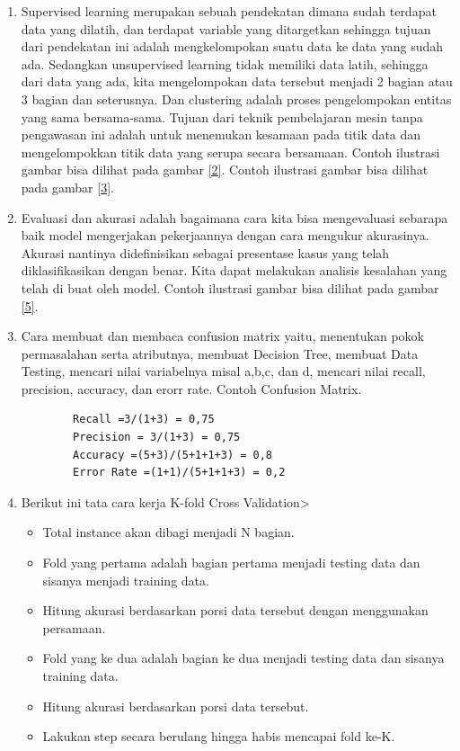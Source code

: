 \begin{enumerate}
\item Supervised learning merupakan sebuah pendekatan dimana sudah terdapat data yang dilatih, dan terdapat variable yang ditargetkan sehingga tujuan dari pendekatan ini adalah mengkelompokan suatu data ke data yang sudah ada. Sedangkan unsupervised learning tidak memiliki data latih, sehingga dari data yang ada, kita mengelompokan data tersebut menjadi 2 bagian atau 3 bagian dan seterusnya. Dan clustering adalah proses pengelompokan entitas yang sama bersama-sama. Tujuan dari teknik pembelajaran mesin tanpa pengawasan ini adalah untuk menemukan kesamaan pada titik data dan mengelompokkan titik data yang serupa secara bersamaan\cite{zhu2009introduction}.
\subitem Contoh ilustrasi gambar bisa dilihat pada gambar \ref{2}.
\subitem Contoh ilustrasi gambar bisa dilihat  pada gambar \ref{3}.
\item Evaluasi dan akurasi adalah bagaimana cara kita bisa mengevaluasi sebarapa baik model mengerjakan pekerjaannya dengan cara mengukur akurasinya. Akurasi nantinya didefinisikan sebagai presentase kasus yang telah diklasifikasikan dengan benar. Kita dapat melakukan analisis kesalahan yang telah di buat oleh model.
\subitem Contoh ilustrasi gambar bisa dilihat pada gambar \ref{5}.
\item Cara membuat dan membaca confusion matrix yaitu, menentukan pokok permasalahan serta atributnya, membuat Decision Tree, membuat Data Testing, mencari nilai variabelnya misal a,b,c, dan d, mencari nilai recall, precision, accuracy, dan erorr rate.
\subitem Contoh Confusion Matrix.
\begin{verbatim}
		Recall =3/(1+3) = 0,75
		Precision = 3/(1+3) = 0,75
		Accuracy =(5+3)/(5+1+1+3) = 0,8
		Error Rate =(1+1)/(5+1+1+3) = 0,2 
\end{verbatim}
\item Berikut ini tata cara kerja K-fold Cross Validation>
	\begin{itemize}
		\item Total instance akan dibagi menjadi N bagian.
		\item Fold yang pertama adalah bagian pertama menjadi testing data dan sisanya menjadi training data.
		\item Hitung akurasi berdasarkan porsi data tersebut dengan menggunakan persamaan.
		\item Fold yang ke dua adalah bagian ke dua menjadi testing data dan sisanya training data. 
		\item Hitung akurasi berdasarkan porsi data tersebut.
		\item Lakukan step secara berulang hingga habis mencapai fold ke-K.

\end{itemize}
\end{enumerate}
